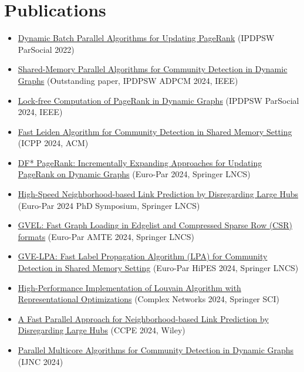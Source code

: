 \section*{Publications}

\begin{itemize}[noitemsep, leftmargin=*]
  \item \href{https://ieeexplore.ieee.org/abstract/document/9835216/}{Dynamic Batch Parallel Algorithms for Updating PageRank} (IPDPSW ParSocial 2022)
  \item \href{https://ieeexplore.ieee.org/abstract/document/10596428/}{Shared-Memory Parallel Algorithms for Community Detection in Dynamic Graphs} (Outstanding paper, IPDPSW ADPCM 2024, IEEE)
  \item \href{https://ieeexplore.ieee.org/abstract/document/10596502/}{Lock-free Computation of PageRank in Dynamic Graphs} (IPDPSW ParSocial 2024, IEEE)
  \item \href{https://dl.acm.org/doi/abs/10.1145/3673038.3673146}{Fast Leiden Algorithm for Community Detection in Shared Memory Setting} (ICPP 2024, ACM)
  \item \href{https://link.springer.com/chapter/10.1007/978-3-031-69583-4_22}{DF* PageRank: Incrementally Expanding Approaches for Updating PageRank on Dynamic Graphs} (Euro-Par 2024, Springer LNCS)
  \item \href{https://arxiv.org/abs/2401.11415}{High-Speed Neighborhood-based Link Prediction by Disregarding Large Hubs} (Euro-Par 2024 PhD Symposium, Springer LNCS)
  \item \href{https://arxiv.org/abs/2311.14650}{GVEL: Fast Graph Loading in Edgelist and Compressed Sparse Row (CSR) formats} (Euro-Par AMTE 2024, Springer LNCS)
  \item \href{https://arxiv.org/abs/2312.08140}{GVE-LPA: Fast Label Propagation Algorithm (LPA) for Community Detection in Shared Memory Setting} (Euro-Par HiPES 2024, Springer LNCS)
  \item \href{https://arxiv.org/abs/2312.04876}{High-Performance Implementation of Louvain Algorithm with Representational Optimizations} (Complex Networks 2024, Springer SCI)
  \item \href{https://onlinelibrary.wiley.com/doi/10.1002/cpe.8331}{A Fast Parallel Approach for Neighborhood-based Link Prediction by Disregarding Large Hubs} (CCPE 2024, Wiley)
  \item \href{https://www.jstage.jst.go.jp/article/ijnc/15/1/15_2/_article/-char/ja/}{Parallel Multicore Algorithms for Community Detection in Dynamic Graphs} (IJNC 2024)
\end{itemize}




